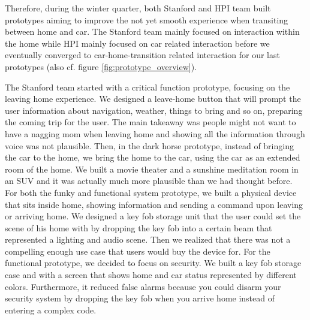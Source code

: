 Therefore, during the winter quarter, both Stanford and HPI team built prototypes aiming to improve the not yet smooth experience when transiting between home and car. The Stanford team mainly focused on interaction within the home while HPI mainly focused on car related interaction before we eventually converged to car-home-transition related interaction for our last prototypes (also cf. figure \ref{fig:prototype_overview}). 

The Stanford team started with a critical function prototype, focusing on the leaving home experience. We designed a leave-home button that will prompt the user information about navigation, weather, things to bring and so on, preparing the coming trip for the user. The main takeaway was people might not want to have a nagging mom when leaving home and showing all the information through voice was not plausible. Then, in the dark horse prototype, instead of bringing the car to the home, we bring the home to the car, using the car as an extended room of the home. We built a movie theater and a sunshine meditation room in an SUV and it was actually much more plausible than we had thought before. For both the funky and functional system prototype, we built a physical device that sits inside home, showing information and sending a command upon leaving or arriving home. We designed a key fob storage unit that the user could set the scene of his home with by dropping the key fob into a certain beam that represented a lighting and audio scene. Then we realized that there was not a compelling enough use case that users would buy the device for. For the functional prototype, we decided to focus on security. We built a key fob storage case and with a screen that shows home and car status represented by different colors. Furthermore, it reduced false alarms because you could disarm your security system by dropping the key fob when you arrive home instead of entering a complex code.

